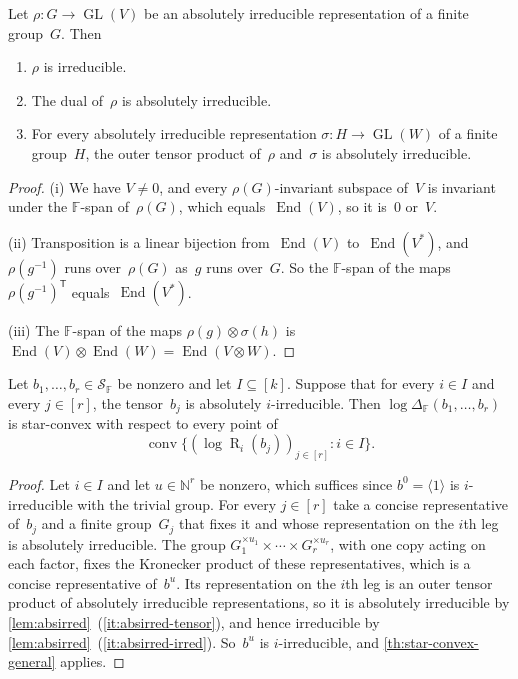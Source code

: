 \documentclass[11pt,letterpaper]{article}
\DeclareMathOperator{\tensorrank}{R}
\newcommand{\FF}{\mathbb{F}}
\newcommand{\NN}{\mathbb{N}}
\DeclareMathOperator{\GL}{GL}
\DeclareMathOperator{\End}{End}
\DeclareMathOperator{\conv}{conv}
\begin{document}
\begin{lemma}\label{lem:absirred}
Let $\rho : G \to \GL(V)$ be an absolutely irreducible representation of a finite group~$G$. Then
\begin{enumerate}[\upshape(i)]
\item\label{it:absirred-irred} $\rho$ is irreducible.
\item\label{it:absirred-dual} The dual of~$\rho$ is absolutely irreducible.
\item\label{it:absirred-tensor} For every absolutely irreducible representation $\sigma : H \to \GL(W)$ of a finite group~$H$, the outer tensor product of~$\rho$ and~$\sigma$ is absolutely irreducible.
\end{enumerate}
\end{lemma}
\begin{proof}
(i) We have $V \neq 0$, and every $\rho(G)$-invariant subspace of~$V$ is invariant under the $\FF$-span of~$\rho(G)$, which equals~$\End(V)$, so it is~$0$ or~$V$.

(ii) Transposition is a linear bijection from~$\End(V)$ to~$\End(V^*)$, and $\rho(g^{-1})$ runs over~$\rho(G)$ as~$g$ runs over~$G$. So the $\FF$-span of the maps $\rho(g^{-1})^{\mathsf{T}}$ equals~$\End(V^*)$.

(iii) The $\FF$-span of the maps $\rho(g) \otimes \sigma(h)$ is $\End(V) \otimes \End(W) = \End(V \otimes W)$.
\end{proof}

\begin{corollary}\label{cor:absirred-generators}
Let $b_1, \ldots, b_r \in \mathcal{S}_\FF$ be nonzero and let $I \subseteq [k]$. Suppose that for every $i \in I$ and every $j \in [r]$, the tensor~$b_j$ is absolutely $i$-irreducible. Then $\log \Delta_\FF(b_1, \ldots, b_r)$ is star-convex with respect to every point of
\[
\conv\bigl\{ (\log \tensorrank_i(b_j))_{j \in [r]} : i \in I \bigr\}.
\]
\end{corollary}
\begin{proof}
Let $i \in I$ and let $u \in \NN^r$ be nonzero, which suffices since $b^0 = \langle 1 \rangle$ is $i$-irreducible with the trivial group. For every $j \in [r]$ take a concise representative of~$b_j$ and a finite group~$G_j$ that fixes it and whose representation on the $i$th leg is absolutely irreducible. The group $G_1^{\times u_1} \times \cdots \times G_r^{\times u_r}$, with one copy acting on each factor, fixes the Kronecker product of these representatives, which is a concise representative of~$b^u$. Its representation on the $i$th leg is an outer tensor product of absolutely irreducible representations, so it is absolutely irreducible by \cref{lem:absirred}~(\ref{it:absirred-tensor}), and hence irreducible by \cref{lem:absirred}~(\ref{it:absirred-irred}). So~$b^u$ is $i$-irreducible, and \cref{th:star-convex-general} applies.
\end{proof}
\end{document}
